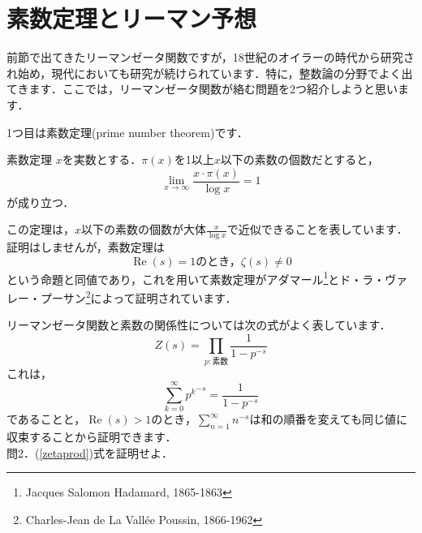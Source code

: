 \documentclass[./main]{subfile}
\begin{document}
\section{素数定理とリーマン予想}

前節で出てきたリーマンゼータ関数ですが，18世紀のオイラーの時代から研究され始め，現代においても研究が続けられています．特に，整数論の分野でよく出てきます．ここでは，リーマンゼータ関数が絡む問題を2つ紹介しようと思います．

1つ目は素数定理(prime number theorem)です．
\begin{itembox}[l]{素数定理}
$x$を実数とする．$\pi(x)$を1以上$x$以下の素数の個数だとすると，
\[
\lim_{x\to\infty}\frac{x\cdot\pi (x)}{\log x}=1
\]
が成り立つ．
\end{itembox}
この定理は，$x$以下の素数の個数が大体$\frac{x}{\log x}$で近似できることを表しています．証明はしませんが，素数定理は
\[
\operatorname{Re}(s)=1\text{のとき，}\zeta(s)\neq 0
\]
という命題と同値であり，これを用いて素数定理がアダマール\footnote{Jacques Salomon Hadamard, 1865-1863}とド・ラ・ヴァレー・プーサン\footnote{Charles-Jean de La Vall\'ee Poussin, 1866-1962}によって証明されています．

リーマンゼータ関数と素数の関係性については次の式がよく表しています．
\begin{equation}\label{zetaprod}
Z(s)=\prod_{p:\text{素数}}\frac{1}{1-p^{-s}}
\end{equation}
これは，
\[
\sum_{k=0}^{\infty}{p^k}^{-s}=\frac{1}{1-p^{-s}}
\]
であることと，$\operatorname{Re}(s)>1$のとき，$\sum_{n=1}^{\infty}n^{-s}$は和の順番を変えても同じ値に収束することから証明できます．\vspace{\baselineskip}\\
問2．(\ref{zetaprod})式を証明せよ．\vspace{\baselineskip}
\end{document}
